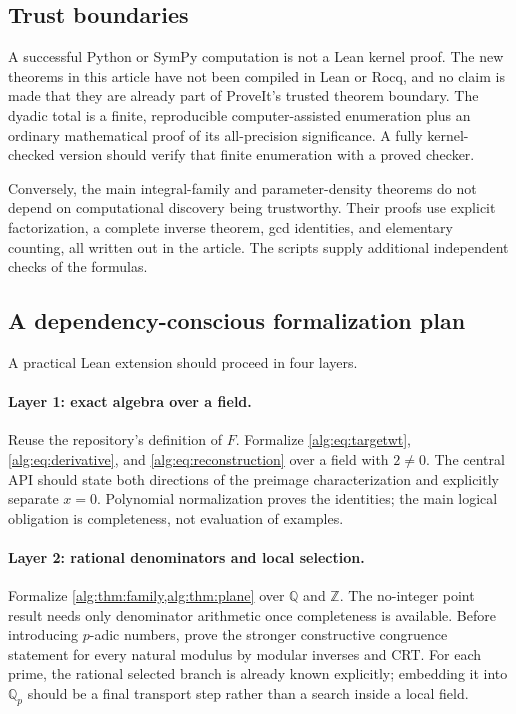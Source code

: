 \documentclass[11pt]{article}
\numberwithin{equation}{section}
\theoremstyle{plain}
\theoremstyle{plain}
\theoremstyle{plain}
\theoremstyle{definition}
\theoremstyle{definition}
\theoremstyle{definition}
\theoremstyle{remark}
\newcommand{\Z}{\mathbb Z}\newcommand{\Q}{\mathbb Q}
\begin{document}
\subsection{Trust boundaries}
A successful Python or SymPy computation is not a Lean kernel proof.
The new theorems in this article have not been compiled in Lean or Rocq,
and no claim is made that they are already part of ProveIt's trusted
theorem boundary. The dyadic total is a finite, reproducible
computer-assisted enumeration plus an ordinary mathematical proof of its
all-precision significance. A fully kernel-checked version should verify
that finite enumeration with a proved checker.

Conversely, the main integral-family and parameter-density theorems do
not depend on computational discovery being trustworthy. Their proofs
use explicit factorization, a complete inverse theorem, gcd identities,
and elementary counting, all written out in the article. The scripts
supply additional independent checks of the formulas.

\subsection{A dependency-conscious formalization plan}
A practical Lean extension should proceed in four layers.

\paragraph{Layer 1: exact algebra over a field.}
Reuse the repository's definition of $F$. Formalize
\eqref{alg:eq:targetwt}, \eqref{alg:eq:derivative}, and
\eqref{alg:eq:reconstruction} over a field with $2\ne0$. The central API should
state both directions of the preimage characterization and explicitly
separate $x=0$. Polynomial normalization proves the identities; the main
logical obligation is completeness, not evaluation of examples.

\paragraph{Layer 2: rational denominators and local selection.}
Formalize \cref{alg:thm:family,alg:thm:plane} over $\Q$ and $\Z$. The no-integer
point result needs only denominator arithmetic once completeness is
available. Before introducing $p$-adic numbers, prove the stronger
constructive congruence statement for every natural modulus by modular
inverses and CRT. For each prime, the rational selected branch is already
known explicitly; embedding it into $\Q_p$ should be a final transport
step rather than a search inside a local field.
\end{document}
